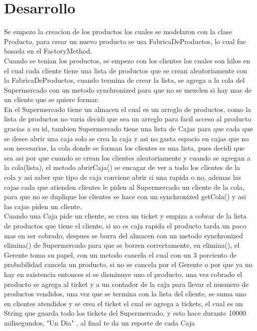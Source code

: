 \documentclass[12pt]{article}
\begin{document}
\section{Desarrollo}
Se empezo la creacion de los productos los cuales se modelaron con la clase Producto, para crear un nuevo producto se usa FabricaDeProductos, lo cual fue basada en el FactoryMethod.\\ Cuando se tenian los productos, se empezo con los clientes los cuales son hilos en el cual cada cliente tiene una lista de productos que se crean aleatoriamente con la FabricaDeProductos, cuando termina de crear la lista, se agrega a la cola del Supermercado con un metodo synchronized para que no se mezclen si hay mas de un cliente que se quiere formar.\\
En el Supermercado tiene un almacen el cual es un arreglo de productos, como la lista de productos no varia decidi que sea un arreglo para facil acceso al producto gracias a su id, tambien Supermercado tiene una lista de Cajas para que cada que se desee abrir una caja solo se crea la caja y asi no gasta espacio en cajas que no son necesarias, la cola donde se forman los clientes es una lista, pues decidi que sea asi por que cuando se crean los clientes aleatoriamente y cuando se agregan a la cola(lista), el metodo abrirCaja() se encagar de ver a todo los clientes de la cola y asi saber que tipo de caja conviene abrir si una rapida o no, ademas las cajas cada que atienden clientes le piden al Supermercado un cliente de la cola, para que no se duplique los clientes se hace con un synchronized getCola() y asi las cajas piden un cliente. \\
Cuando una Caja pide un cliente, se crea un ticket y empiza a cobrar de la lista de productos que tiene el cliente, si no es caja rapida el producto tarda un poco mas en ser cobrado, despues se borra del almacen con un metodo synchronized elimina() de Supermercado para que se borren correctamente, en elimina(), el Gerente toma su papel, con un metodo cancela el cual con un 3 porciento de probabilidad cancela un producto, si no se cancela por el Gerente o por que ya no hay en existencia entonces si se disminuye uno el producto, una vez cobrado el producto se agrega al ticket y a un contador de la caja para llevar el nuemero de productos vendidos, una vez que se termina con la lista del cliente, se suma uno en clientes atendidos y se crea el ticket el cual se agrega a tickets, el cual es un String que guarda todo los tickets del Supermercado, y esto hace durante 10000  milisegundos, "Un Dia" , al final te da un reporte de cada Caja
\end{document}

